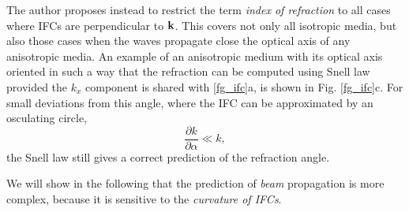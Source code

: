 The author proposes instead to restrict the term \textit{index of refraction} to all cases where IFCs are perpendicular to ${\mathbf{k}}$. This covers not only all isotropic media, but also those cases when the waves propagate close the optical axis of any anisotropic media. An example of an anisotropic medium with its optical axis oriented in such a way that the refraction can be computed using Snell law provided the $k_x$ component is shared with \ref{fg_ifc}a, is shown in Fig. \ref{fg_ifc}c. For small deviations from this angle, where the IFC can be approximated by an osculating circle, 
\begin{equation} \frac{\partial k}{\partial \alpha} \ll k,\label{eq_osculating}\end{equation}
the Snell law still gives a correct prediction of the refraction angle. 

We will show in the following that the prediction of \textit{beam} propagation is more complex, because it is sensitive to the \textit{curvature of IFCs}. 

